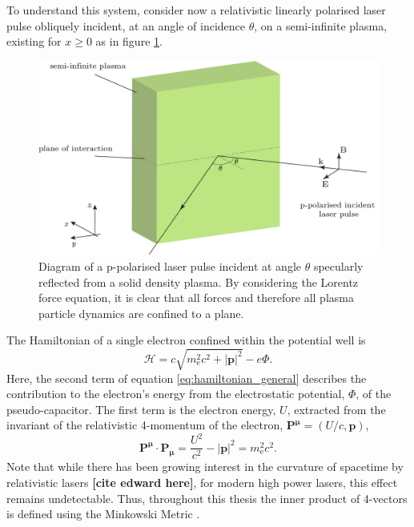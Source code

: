To understand this system, consider now a relativistic linearly polarised laser pulse obliquely incident, at an angle of incidence $\theta$, on a semi-infinite plasma, existing for $x\ge0$ as in figure \ref{fig:zvpforcesppol}.
\begin{figure}
	\centering
	\includegraphics[width=0.7\linewidth]{figures/zvp/zvp_forces_ppol}
	\caption[Diagram of a p-polarised laser pulse incident at angle $\theta$ specularly reflected from a solid density plasma.]{Diagram of a p-polarised laser pulse incident at angle $\theta$ specularly reflected from a solid density plasma. By considering the Lorentz force equation, it is clear that all forces and therefore all plasma particle dynamics are confined to a plane.}
	\label{fig:zvpforcesppol}
\end{figure}
The Hamiltonian of a single electron confined within the potential well \cite{goldsteinClassicalMechanics2013} is
\begin{equation}\label{eq:hamiltonian_general}
	\mathcal{H} = c\sqrt{m^2_\mathrm{e}c^2 + |\mathbf{p}|^2} - e\Phi.
\end{equation}
Here, the second term of equation \ref{eq:hamiltonian_general} describes the contribution to the electron's energy from the electrostatic potential, $\Phi$, of the pseudo-capacitor. The first term is the electron energy, $U$, extracted from the invariant of the relativistic 4-momentum of the electron, $\mathbf{P^\mu} = (U/c, \mathbf{p})$,
\begin{equation}\label{eq:zvp-energy_invariant}
	\mathbf{P^\mu \cdot P_\mu} = \frac{U^2}{c^2} - |\mathbf{p}|^2 = m^2_\mathrm{e}c^2.
\end{equation}
Note that while there has been growing interest in the curvature of spacetime by relativistic lasers \textbf{[cite edward here]}, for modern high power lasers, this effect remains undetectable. Thus, throughout this thesis the inner product of 4-vectors is defined using the Minkowski Metric \cite{steaneRelativityMadeRelatively2012}.

